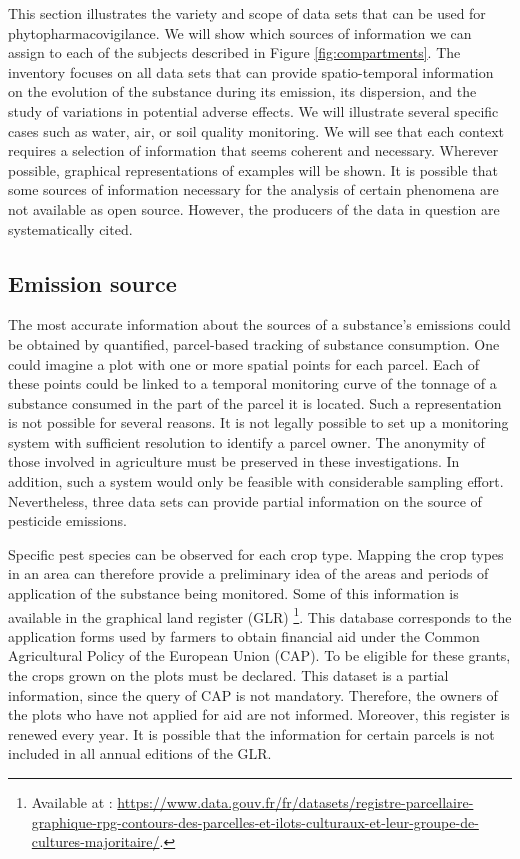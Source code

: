 This section illustrates the variety and scope of data sets that can be used for phytopharmacovigilance. We will show which sources of information we can assign to each of the subjects described in Figure \ref{fig:compartments}. The inventory focuses on all data sets that can provide spatio-temporal information on the evolution of the substance during its emission, its dispersion, and the study of variations in potential adverse effects. We will illustrate several specific cases such as water, air, or soil quality monitoring. We will see that each context requires a selection of information that seems coherent and necessary. Wherever possible, graphical representations of examples will be shown. It is possible that some sources of information necessary for the analysis of certain phenomena are not available as open source. However, the producers of the data in question are systematically cited.

\subsection{Emission source}

The most accurate information about the sources of a substance's emissions could be obtained by quantified, parcel-based tracking of substance consumption. One could imagine a plot with one or more spatial points for each parcel. Each of these points could be linked to a temporal monitoring curve of the tonnage of a substance consumed in the part of the parcel it is located. Such a representation is not possible for several reasons. It is not legally possible to set up a monitoring system with sufficient resolution to identify a parcel owner. The anonymity of those involved in agriculture must be preserved in these investigations. In addition, such a system would only be feasible with considerable sampling effort. Nevertheless, three data sets can provide partial information on the source of pesticide emissions. 

Specific pest species can be observed for each crop type. Mapping the crop types in an area can therefore provide a preliminary idea of the areas and periods of application of the substance being monitored. Some of this information is available in the graphical land register (GLR) \footnote{Available at : \url{https://www.data.gouv.fr/fr/datasets/registre-parcellaire-graphique-rpg-contours-des-parcelles-et-ilots-culturaux-et-leur-groupe-de-cultures-majoritaire/}.}. This database corresponds to the application forms used by farmers to obtain financial aid under the Common Agricultural Policy of the European Union (CAP). To be eligible for these grants, the crops grown on the plots must be declared. This dataset is a partial information, since the query of CAP is not mandatory. Therefore, the owners of the plots who have not applied for aid are not informed. Moreover, this register is renewed every year. It is possible that the information for certain parcels is not included in all annual editions of the GLR. 

